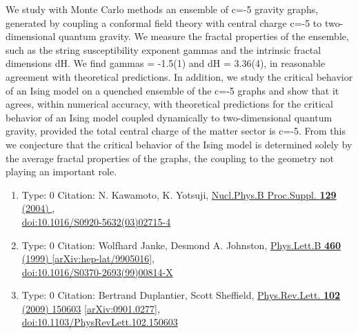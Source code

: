\documentclass[a4paper,10pt]{article}
\begin{document}
\begin{enumerate}
We study with Monte Carlo methods an ensemble of c=-5 gravity graphs, generated by coupling a conformal field theory with central charge c=-5 to two-dimensional quantum gravity. We measure the fractal properties of the ensemble, such as the string susceptibility exponent gammas and the intrinsic fractal dimensions dH. We find gammas = -1.5(1) and dH = 3.36(4), in reasonable agreement with theoretical predictions. In addition, we study the critical behavior of an Ising model on a quenched ensemble of the c=-5 graphs and show that it agrees, within numerical accuracy, with theoretical predictions for the critical behavior of an Ising model coupled dynamically to two-dimensional quantum gravity, provided the total central charge of the matter sector is c=-5. From this we conjecture that the critical behavior of the Ising model is determined solely by the average fractal properties of the graphs, the coupling to the geometry not playing an important role.
\begin{enumerate}
  \item Type: 0 Citation: N. Kawamoto, K. Yotsuji, \href{https://www.doi.org/10.1016/S0920-5632(03)02715-4}{Nucl.Phys.B Proc.Suppl. {\bf 129} (2004) },\\\href{https://www.doi.org/10.1016/S0920-5632(03)02715-4}{doi:10.1016/S0920-5632(03)02715-4}
  \item Type: 0 Citation: Wolfhard Janke, Desmond A. Johnston, \href{https://www.doi.org/10.1016/S0370-2693(99)00814-X}{Phys.Lett.B {\bf 460} (1999) }  \href{https://arxiv.org/abs/hep-lat/9905016}{[arXiv:hep-lat/9905016]},\\\href{https://www.doi.org/10.1016/S0370-2693(99)00814-X}{doi:10.1016/S0370-2693(99)00814-X}
  \item Type: 0 Citation: Bertrand Duplantier, Scott Sheffield, \href{https://www.doi.org/10.1103/PhysRevLett.102.150603}{Phys.Rev.Lett. {\bf 102} (2009) 150603}  \href{https://arxiv.org/abs/0901.0277}{[arXiv:0901.0277]},\\\href{https://www.doi.org/10.1103/PhysRevLett.102.150603}{doi:10.1103/PhysRevLett.102.150603}

\end{enumerate}
\end{enumerate}
\end{document}
